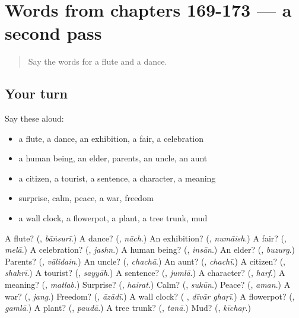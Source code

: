 \section[(dialogue)]{Words from chapters 169-173 — a second pass}

\label{lesson:UR-R173-second-pass-words-from-chapters-169-173}



\begin{quote}
Say the words for a flute and a dance.
\end{quote}

\subsection*{Your turn}
Say these aloud:

\begin{itemize}
\raggedright
  \item a flute, a dance, an exhibition, a fair, a celebration
  \item a human being, an elder, parents, an uncle, an aunt
  \item a citizen, a tourist, a sentence, a character, a meaning
  \item surprise, calm, peace, a war, freedom
  \item a wall clock, a flowerpot, a plant, a tree trunk, mud
\end{itemize}

\begin{tcolorbox}[breakable,colback=teal!4,colframe=teal!35!black,title={Before you move on}]
A flute? (\textbf{}, \emph{bāṅsurī}.) A dance? (\textbf{}, \emph{nāch}.) An exhibition? (\textbf{}, \emph{numāish}.) A fair? (\textbf{}, \emph{melā}.) A celebration? (\textbf{}, \emph{jashn}.) A human being? (\textbf{}, \emph{insān}.) An elder? (\textbf{}, \emph{buzurg}.) Parents? (\textbf{}, \emph{vālidain}.) An uncle? (\textbf{}, \emph{chachā}.) An aunt? (\textbf{}, \emph{chachī}.) A citizen? (\textbf{}, \emph{shahrī}.) A tourist? (\textbf{}, \emph{sayyāh}.) A sentence? (\textbf{}, \emph{jumlā}.) A character? (\textbf{}, \emph{harf}.) A meaning? (\textbf{}, \emph{matlab}.) Surprise? (\textbf{}, \emph{hairat}.) Calm? (\textbf{}, \emph{sukūn}.) Peace? (\textbf{}, \emph{aman}.) A war? (\textbf{}, \emph{jang}.) Freedom? (\textbf{}, \emph{āzādī}.) A wall clock? (\textbf{ }, \emph{dīvār ghaṛī}.) A flowerpot? (\textbf{}, \emph{gamlā}.) A plant? (\textbf{}, \emph{paudā}.) A tree trunk? (\textbf{}, \emph{tanā}.) Mud? (\textbf{}, \emph{kīchaṛ}.)
\end{tcolorbox}
